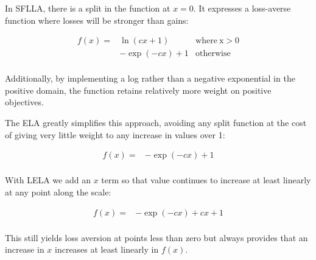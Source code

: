 



In SFLLA, there is a split in the function at $x=0$. It expresses a loss-averse function where losses will be stronger than gains:

\begin{align}
f(x)= & \ln(cx+1) & \mathrm{ where \: x>0} \\ \nonumber
  &  -\exp(-cx)+1 &  \mathrm{otherwise} \\ \nonumber
\end{align}

Additionally, by implementing a log rather than a negative exponential in the positive domain, the function retains relatively more weight on positive objectives.

The ELA greatly simplifies this approach, avoiding any split function at the cost of giving very little weight to any increase in values over 1:

\begin{align}
f(x)= &  -\exp(-cx)+1 \\ \nonumber
\end{align}

With LELA we add an $x$ term so that value continues to increase at least linearly at any point along the scale:


\begin{align}
f(x)= &  -\exp(-cx)+cx+1 \\ \nonumber
\end{align}

This still yields loss aversion at points less than zero but always provides that an increase in $x$ increases at least linearly in $f(x)$.


